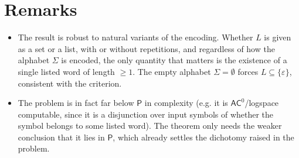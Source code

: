 \documentclass{amsart}
\theoremstyle{definition}
\begin{document}
\section{Remarks}

\begin{itemize}
\item The result is robust to natural variants of the encoding. Whether $L$ is
given as a set or a list, with or without repetitions, and regardless of how the
alphabet $\Sigma$ is encoded, the only quantity that matters is the existence of
a single listed word of length $\ge 1$. The empty alphabet $\Sigma = \emptyset$
forces $L \subseteq \{\varepsilon\}$, consistent with the criterion.

\item The problem is in fact far below $\mathsf{P}$ in complexity (e.g. it is
$\mathsf{AC}^0$/logspace computable, since it is a disjunction over input
symbols of whether the symbol belongs to some listed word). The theorem only
needs the weaker conclusion that it lies in $\mathsf{P}$, which already settles
the dichotomy raised in the problem.
\end{itemize}
\end{document}
